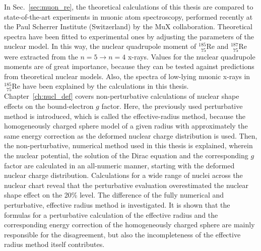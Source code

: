 In Sec.~\ref{sec:muon_re}, the theoretical calculations of this thesis are compared to state-of-the-art experiments in muonic atom spectroscopy, performed recently at the Paul Scherrer Institute (Switzerland) by the MuX collaboration. Theoretical spectra have been fitted to experimental ones by adjusting the parameters of the nuclear model. In this way, the nuclear quadrupole moment of $_{\phantom{1}75}^{185}$Re and $_{\phantom{1}75}^{187}$Re were extracted from the ${n}{=}{5}\rightarrow {n}{=}{4}$ x-rays. Values for the nuclear quadrupole moments are of great importance, because they can be tested against predictions from theoretical nuclear models. 
Also, the spectra of low-lying muonic x-rays in $_{\phantom{1}75}^{185}$Re have been explained by the calculations in this thesis.\\[11pt]%
%
Chapter~\ref{ch:nucl_def} covers non-perturbative calculations of nuclear shape effects on the bound-electron $g$ factor. Here, the previously used perturbative method is introduced, which is called the effective-radius method, because the homogeneously charged sphere model of a given radius with approximately the same energy correction as the deformed nuclear charge distribution is used. 
Then, the non-perturbative, numerical method used in this thesis is explained, wherein the nuclear potential, the solution of the Dirac equation and the corresponding $g$ factor are calculated in an all-numeric manner, starting with the deformed nuclear charge distribution. Calculations for a wide range of nuclei across the nuclear chart reveal that the perturbative evaluation overestimated the nuclear shape effect on the 20\% level. The difference of the fully numerical and perturbative, effective radius method is investigated. It is shown that the formulas for a perturbative calculation of the effective radius and the corresponding energy correction of the homogeneously charged sphere are mainly responsible for the disagreement, but also the incompleteness of the effective radius method itself contributes.

